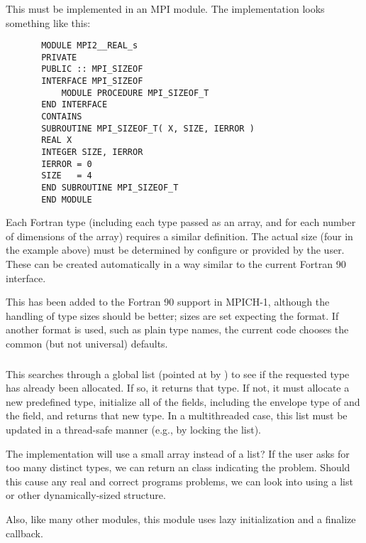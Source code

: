 \documentclass{article}
\begin{document}
\subsubsection{}
This must be implemented in an MPI module.  The implementation looks something
like this:
\begin{verbatim}
       MODULE MPI2__REAL_s
       PRIVATE
       PUBLIC :: MPI_SIZEOF
       INTERFACE MPI_SIZEOF
           MODULE PROCEDURE MPI_SIZEOF_T
       END INTERFACE
       CONTAINS
       SUBROUTINE MPI_SIZEOF_T( X, SIZE, IERROR )
       REAL X
       INTEGER SIZE, IERROR
       IERROR = 0
       SIZE   = 4
       END SUBROUTINE MPI_SIZEOF_T       
       END MODULE
\end{verbatim}
Each Fortran type (including each type passed as an array, and for
each number of dimensions of the array) requires a similar
definition.  The actual size (four in the example above) must be determined by
configure or provided by the user.
These can be created automatically in a way similar to the current
Fortran 90 interface.

This has been added to the Fortran 90 support in MPICH-1, although the
handling of type sizes should be better; sizes are set expecting the
 format.  If another format is used, such as plain type
names, the current code chooses the common (but not universal) defaults.

\subsubsection{}
This searches through a global list (pointed at by
) to see if the requested type has
already been allocated.  If so, it returns that type.  
If not, it must allocate a new predefined type, initialize all of the fields,
including the envelope type of  and the
 field, and returns that new type.
In a multithreaded case, this list must be updated in a thread-safe manner
(e.g., by locking the list).

The implementation will use a small array instead of a list?  If the
user asks for too many distinct types, we can return an
 class indicating the problem.  Should this
cause any real and correct programs problems, we can look into using a
list or other dynamically-sized structure.

Also, like many other modules, this module uses lazy initialization
and a finalize callback.
\end{document}
